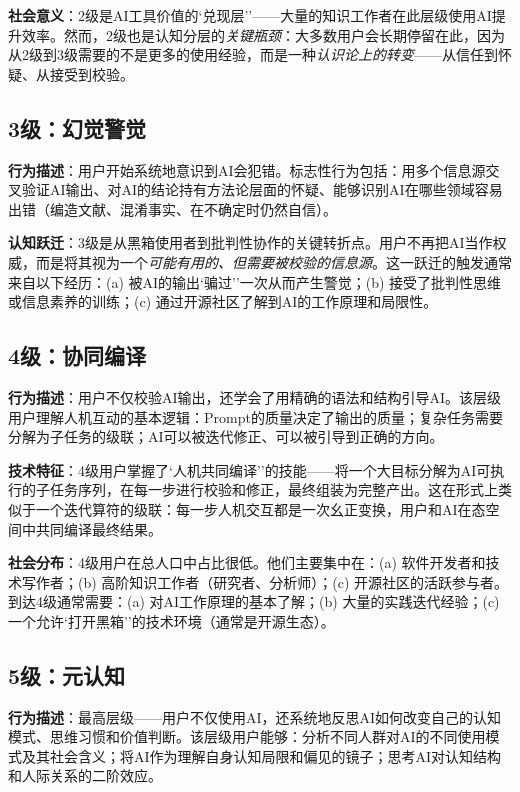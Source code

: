 \documentclass[12pt,a4paper]{ctexart}
\begin{document}
\textbf{社会意义}：2级是AI工具价值的`兑现层''——大量的知识工作者在此层级使用AI提升效率。然而，2级也是认知分层的\textit{关键瓶颈}：大多数用户会长期停留在此，因为从2级到3级需要的不是更多的使用经验，而是一种\textit{认识论上的转变}——从信任到怀疑、从接受到校验。

\subsection{3级：幻觉警觉}

\textbf{行为描述}：用户开始系统地意识到AI会犯错。标志性行为包括：用多个信息源交叉验证AI输出、对AI的结论持有方法论层面的怀疑、能够识别AI在哪些领域容易出错（编造文献、混淆事实、在不确定时仍然自信）。

\textbf{认知跃迁}：3级是从黑箱使用者到批判性协作的关键转折点。用户不再把AI当作权威，而是将其视为一个\emph{可能有用的、但需要被校验的信息源}。这一跃迁的触发通常来自以下经历：(a) 被AI的输出`骗过''一次从而产生警觉；(b) 接受了批判性思维或信息素养的训练；(c) 通过开源社区了解到AI的工作原理和局限性。

\subsection{4级：协同编译}

\textbf{行为描述}：用户不仅校验AI输出，还学会了用精确的语法和结构引导AI。该层级用户理解人机互动的基本逻辑：Prompt的质量决定了输出的质量；复杂任务需要分解为子任务的级联；AI可以被迭代修正、可以被引导到正确的方向。

\textbf{技术特征}：4级用户掌握了`人机共同编译''的技能——将一个大目标分解为AI可执行的子任务序列，在每一步进行校验和修正，最终组装为完整产出。这在形式上类似于一个迭代算符的级联：每一步人机交互都是一次幺正变换，用户和AI在态空间中共同编译最终结果。

\textbf{社会分布}：4级用户在总人口中占比很低。他们主要集中在：(a) 软件开发者和技术写作者；(b) 高阶知识工作者（研究者、分析师）；(c) 开源社区的活跃参与者。到达4级通常需要：(a) 对AI工作原理的基本了解；(b) 大量的实践迭代经验；(c) 一个允许`打开黑箱''的技术环境（通常是开源生态）。

\subsection{5级：元认知}

\textbf{行为描述}：最高层级——用户不仅使用AI，还系统地反思AI如何改变自己的认知模式、思维习惯和价值判断。该层级用户能够：分析不同人群对AI的不同使用模式及其社会含义；将AI作为理解自身认知局限和偏见的镜子；思考AI对认知结构和人际关系的二阶效应。
\end{document}

